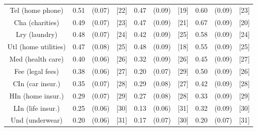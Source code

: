 \documentclass[a4paper,10pt]{article}
\begin{document}
\begin{tabular}{cccccccccc}
Tel (home phone)&0.51&(0.07)&[22] & 0.47&(0.09)&[19] & 0.60 & (0.09) & [23] \\
Cha (charities)&0.49&(0.07)&[23] & 0.47&(0.09)&[21] & 0.67 & (0.09) & [20] \\
Lry (laundry)&0.48&(0.07)&[24] & 0.42&(0.09)&[25] & 0.58 & (0.09) & [24] \\
Utl (home utilities)&0.47&(0.08)&[25] & 0.48&(0.09)&[18] & 0.55 & (0.09) & [25]
\\
Med (health care)&0.40&(0.06)&[26] & 0.32&(0.09)&[26] & 0.45 & (0.09) & [27] \\
Fee (legal fees)&0.38&(0.06)&[27] & 0.20&(0.07)&[29] & 0.50 & (0.09) & [26] \\
CIn (car insur.)&0.35&(0.07)&[28] & 0.29&(0.08)&[27] & 0.42 & (0.09) & [28] \\
HIn (home insur.)&0.29&(0.07)&[29] & 0.27&(0.08)&[28] & 0.33 & (0.09) & [29] \\
LIn (life insur.)&0.25&(0.06)&[30] & 0.13&(0.06)&[31] & 0.32 & (0.09) & [30] \\
Und (underwear)&0.20&(0.06)&[31] & 0.17&(0.07)&[30] & 0.20 & (0.07) & [31] \\
\hline \hline
\end{tabular}
\end{document}
